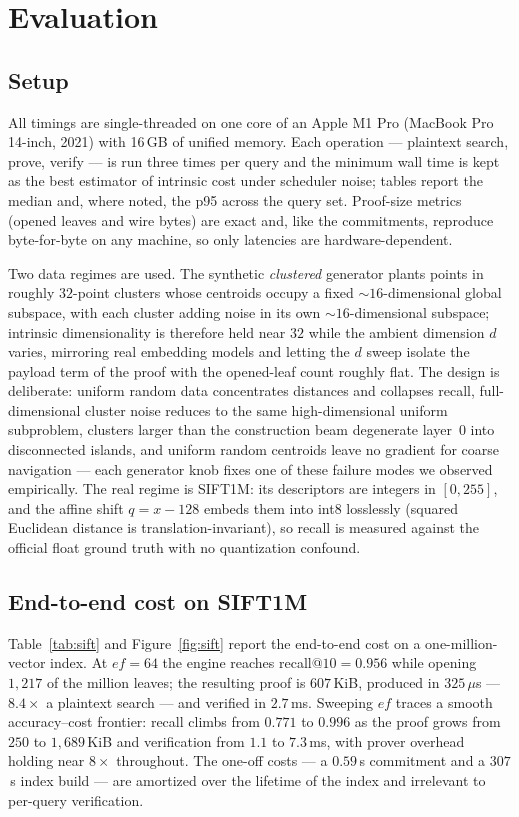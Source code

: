 \documentclass[11pt]{article}
\begin{document}
\section{Evaluation}\label{sec:eval}

\subsection{Setup}

All timings are single-threaded on one core of an Apple M1 Pro
(MacBook Pro 14-inch, 2021) with 16\,GB of unified memory. Each operation ---
plaintext search, prove, verify --- is run three times per query and the
minimum wall time is kept as the best estimator of intrinsic cost under
scheduler noise; tables report the median and, where noted, the p95
across the query set. Proof-size metrics (opened leaves and wire bytes)
are exact and, like the commitments, reproduce byte-for-byte on any
machine, so only latencies are hardware-dependent.

Two data regimes are used. The synthetic \emph{clustered} generator
plants points in roughly $32$-point clusters whose centroids occupy a
fixed ${\sim}16$-dimensional global subspace, with each cluster adding
noise in its own ${\sim}16$-dimensional subspace; intrinsic
dimensionality is therefore held near $32$ while the ambient dimension
$d$ varies, mirroring real embedding models and letting the $d$ sweep
isolate the payload term of the proof with the opened-leaf count roughly
flat. The design is deliberate: uniform random data concentrates
distances and collapses recall, full-dimensional cluster noise reduces
to the same high-dimensional uniform subproblem, clusters larger than
the construction beam degenerate layer~$0$ into disconnected islands,
and uniform random centroids leave no gradient for coarse navigation ---
each generator knob fixes one of these failure modes we observed
empirically. The real regime is SIFT1M: its descriptors are integers in
$[0,255]$, and the affine shift $q=x-128$ embeds them into int8
losslessly (squared Euclidean distance is translation-invariant), so
recall is measured against the official float ground truth with no
quantization confound.

\subsection{End-to-end cost on SIFT1M}

Table~\ref{tab:sift} and Figure~\ref{fig:sift} report the end-to-end
cost on a one-million-vector index. At $\mathit{ef}=64$ the engine
reaches recall@$10=0.956$ while opening $1{,}217$ of the million leaves;
the resulting proof is $607$\,KiB, produced in $325\,\mu$s ---
$8.4\times$ a plaintext search --- and verified in $2.7$\,ms. Sweeping
$\mathit{ef}$ traces a smooth accuracy--cost frontier: recall climbs
from $0.771$ to $0.996$ as the proof grows from $250$ to $1{,}689$\,KiB
and verification from $1.1$ to $7.3$\,ms, with prover overhead holding
near $8\times$ throughout. The one-off costs --- a $0.59$\,s commitment
and a $307$\,s index build --- are amortized over the lifetime of the
index and irrelevant to per-query verification.
\end{document}
